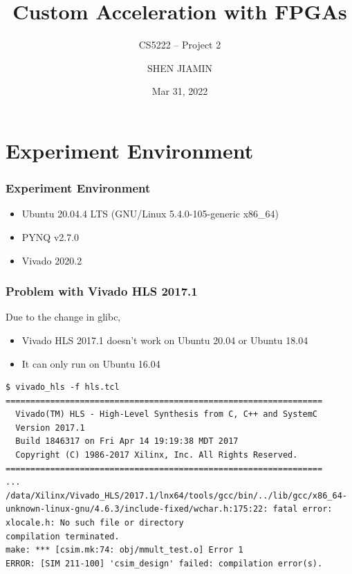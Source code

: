 \documentclass[aspectratio=169]{beamer}
\title{Custom Acceleration with FPGAs}
\subtitle{CS5222 -- Project 2}
\author{SHEN JIAMIN}
\institute{A0209166A \\ \href{mailto:shen_jiamin@u.nus.edu}{\nolinkurl{shen_jiamin@u.nus.edu}}}
\date{Mar 31, 2022}
\begin{document}
\frame{\titlepage}


\section{Experiment Environment}

\begin{frame}
    \frametitle{Experiment Environment}
    \begin{itemize}
        \item Ubuntu 20.04.4 LTS (GNU/Linux 5.4.0-105-generic x86\_64)
        \item PYNQ v2.7.0
        \item Vivado 2020.2
    \end{itemize}
\end{frame}

\begin{frame}[fragile]
    \frametitle{Problem with Vivado HLS 2017.1}

    Due to the change in glibc,
    \begin{itemize}
        \item Vivado HLS 2017.1 doesn't work on Ubuntu 20.04 or Ubuntu 18.04
        \item It can only run on Ubuntu 16.04
    \end{itemize}

    \begin{verbatim}
$ vivado_hls -f hls.tcl
================================================================
  Vivado(TM) HLS - High-Level Synthesis from C, C++ and SystemC
  Version 2017.1
  Build 1846317 on Fri Apr 14 19:19:38 MDT 2017
  Copyright (C) 1986-2017 Xilinx, Inc. All Rights Reserved.
================================================================
...
/data/Xilinx/Vivado_HLS/2017.1/lnx64/tools/gcc/bin/../lib/gcc/x86_64-unknown-linux-gnu/4.6.3/include-fixed/wchar.h:175:22: fatal error: xlocale.h: No such file or directory
compilation terminated.
make: *** [csim.mk:74: obj/mmult_test.o] Error 1
ERROR: [SIM 211-100] 'csim_design' failed: compilation error(s).
    \end{verbatim}
\end{frame}
\end{document}
